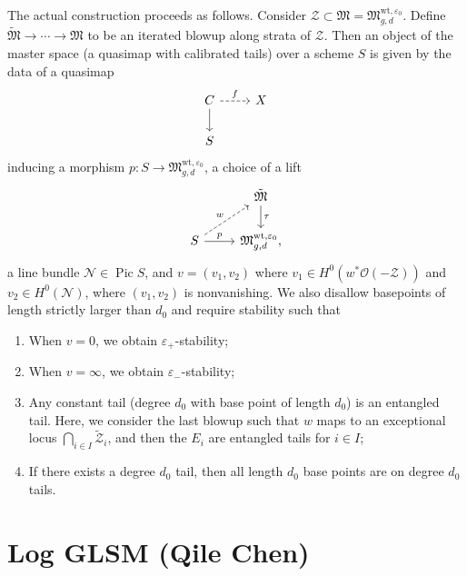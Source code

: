 \documentclass{amsart}
\theoremstyle{definition}
\theoremstyle{remark}
\theoremstyle{plain}
\theoremstyle{definition}
\theoremstyle{remark}
\newcommand{\ep}{\varepsilon}
\newcommand{\mc}[1]{\mathcal{#1}}
\newcommand{\mf}[1]{\mathfrak{#1}}
\newcommand{\mr}[1]{\mathrm{#1}}
\newcommand{\1}{\mathbf{1}}
\newcommand{\2}{\mathbf{2}}
\newcommand{\3}{\mathbf{3}}
\DeclareMathOperator{\Pic}{Pic}
\begin{document}
The actual construction proceeds as follows. Consider \(\mc{Z} \subset \mf{M} = \mf{M}_{g,d}^{\mr{wt}, \ep_0}\). Define \(\tilde{\mf{M}} \to \cdots \to \mf{M}\) to be an iterated blowup along strata of \(\mc{Z}\). Then an object of the master space (a quasimap with calibrated tails) over a scheme \(S\) is given by the data of a quasimap
\begin{equation*}
\begin{tikzcd}
    C \ar{d} \ar[dashrightarrow]{r}{f} & X \\
    S
\end{tikzcd}
\end{equation*}
inducing a morphism \(p \colon S \to \mf{M}_{g,d}^{\mr{wt}, \ep_0}\), a choice of a lift
\begin{equation*}
\begin{tikzcd}
    & \tilde{\mf{M}} \ar{d}{\tau} \\
    S \ar{r}{p} \ar[dashrightarrow]{ur}{w} & \mf{M}_{g,d}^{\mr{wt}, \ep_0},
\end{tikzcd}
\end{equation*}
a line bundle \(\mc{N} \in \Pic S\), and \(v = (v_1, v_2)\) where \(v_1 \in H^0(w^* \mc{O}(-\mc{Z}))\) and \(v_2 \in H^0(\mc{N})\), where \((v_1, v_2)\) is nonvanishing. We also disallow basepoints of length strictly larger than \(d_0\) and require stability such that
\begin{enumerate}
    \item When \(v = 0\), we obtain \(\ep_+\)-stability;
    \item When \(v = \infty\), we obtain \(\ep_-\)-stability;
    \item Any constant tail (degree \(d_0\) with base point of length \(d_0\)) is an entangled tail. Here, we consider the last blowup such that \(w\) maps to an exceptional locus \(\bigcap_{i \in I} \tilde{\mc{Z}}_i\), and then the \(E_i\) are entangled tails for \(i \in I\);
    \item If there exists a degree \(d_0\) tail, then all length \(d_0\) base points are on degree \(d_0\) tails.
\end{enumerate}







\section{Log GLSM (Qile Chen)}%
\label{sec:Log GLSM (Qile Chen)}
\end{document}
